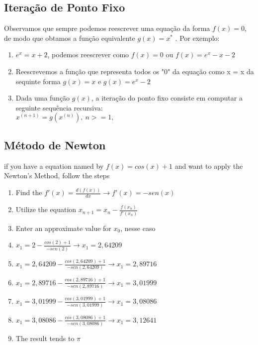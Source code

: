 \documentclass{article}
\begin{document}
\begin{multicols}{2}
    \subsection{Iteração de Ponto Fixo}
        Observamos que sempre podemos reescrever uma equação da forma $ f(x) = 0 $, de modo que obtamos a função equivalente $ g(x) = x^* $ 
        . Por exemplo:

        \begin{enumerate}
            \item $ e^x = x + 2 $, podemos reescrever como $ f(x) = 0 $ ou $ f(x) = e^x - x - 2 $
            \item Reescrevemos a função que representa todos os "0" da equação como x = x da sequinte forma $ g(x) = x $ e $ g(x) = e^x - 2 $ 
            \item Dada uma função $ g(x) $, a iteração do ponto fixo consiste em computar a seguinte sequência recursiva: \\ $ x^{(n+1)} = g(x^{(n)}),\  n >= 1, $
        \end{enumerate}

    \subsection{Método de Newton}
        if you have a equation named by $ f(x) = cos(x) + 1$ and want to apply the Newton's Method, follow the steps

        
        \begin{enumerate}
            \item Find the $ f'(x) = \frac{d(f(x))}{dx} \rightarrow f'(x) = -sen(x) $
            \item Utilize the equation $ x_{n+1} = x_n - \frac{f(x_n)}{f'(x_n)} $ 
            \item Enter an approximate value for $ x_0 $, nesse caso 
            \item $ x_1 =  2 - \frac{cos(2) + 1}{-sen(2)} \rightarrow x_1 = 2,64209 $
            \item $ x_1 =  2,64209 - \frac{cos(2,64209) + 1}{-sen(2,64209)} \rightarrow x_1 = 2,89716 $
            \item $ x_1 =  2,89716 - \frac{cos(2,89716) + 1}{-sen(2,89716)} \rightarrow x_1 = 3,01999 $
            \item $ x_1 =  3,01999 - \frac{cos(3,01999) + 1}{-sen(3,01999)} \rightarrow x_1 = 3,08086 $
            \item $ x_1 =  3,08086 - \frac{cos(3,08086) + 1}{-sen(3,08086)} \rightarrow x_1 = 3,12641 $
            \item The result tends to $ \pi $
        \end{enumerate}


\end{multicols}
\end{document}
